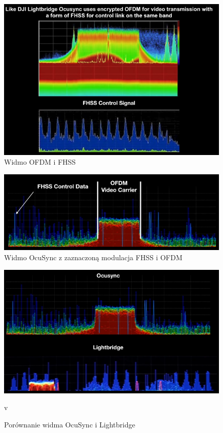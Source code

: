 \begin{figure}[!htbp]
\centering
\includegraphics[width=14cm]{./Obrazy/ocusync_spectrum_1.png}
\caption{Widmo OFDM i FHSS}
\end{figure}

\begin{figure}[!htbp]
\centering
\includegraphics[width=14cm]{./Obrazy/ocusync_spectrum_2.png}
\caption{Widmo OcuSync z zaznaczoną modulacja FHSS i OFDM}
\end{figure}


\begin{figure}[!htbp]
\centering
\includegraphics[width=14cm]{./Obrazy/ocusync_vs_lightbridge.png}
\caption{Porównanie widma OcuSync i Lightbridge}
v
\end{figure}

